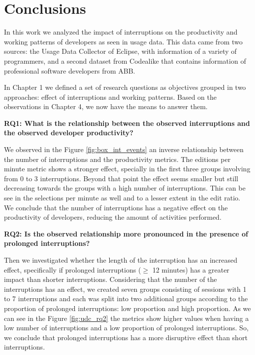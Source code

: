 \chapter{Conclusions}

In this work we analyzed the impact of interruptions on the productivity and working patterns of developers as seen in usage data. This data came from two sources: the Usage Data Collector of Eclipse, with information of a variety of programmers, and a second dataset from Codealike that contains information of professional software developers from ABB.

In Chapter 1 we defined a set of research questions as objectives grouped in two approaches: effect of interruptions and working patterns. Based on the observations in Chapter 4, we now have the means to answer them.

\textbf{RQ1: What is the relationship between the observed interruptions and the observed developer productivity?} 

We observed in the Figure \ref{fig:box_int_events} an inverse relationship between the number of interruptions and the productivity metrics. The editions per minute metric shows a stronger effect, specially in the first three groups involving from 0 to 3 interruptions. Beyond that point the effect seems smaller but still decreasing towards the groups with a high number of interruptions. This can be see in the selections per minute as well and to a lesser extent in the edit ratio. We conclude that the number of interruptions has a negative effect on the productivity of developers, reducing the amount of activities performed.

\textbf{RQ2: Is the observed relationship more pronounced in the presence of prolonged interruptions?}

Then we investigated whether the length of the interruption has an increased effect, specifically if prolonged interruptions ($\geq$ 12 minutes) has a greater impact than shorter interruptions. Considering that the number of the interruptions has an effect, we created seven groups consisting of sessions with 1 to 7 interruptions and each was split into two additional groups according to the proportion of prolonged interruptions: low proportion and high proportion. As we can see in the Figure \ref{fig:udc_rq2} the metrics show higher values when having a low number of interruptions and a low proportion of prolonged interruptions. So, we conclude that prolonged interruptions has a more disruptive effect than short interruptions.

